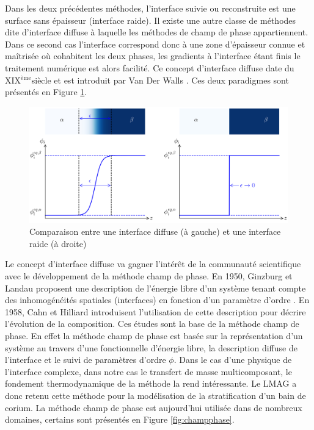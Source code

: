 Dans les deux précédentes méthodes, l'interface suivie ou reconstruite est une surface sans épaisseur (interface raide). Il existe une autre classe de méthodes dite d'interface diffuse à laquelle les méthodes de champ de phase appartiennent.
Dans ce second cas l'interface correspond donc à une zone d'épaisseur connue et maîtrisée où cohabitent les deux phases, les gradients à l'interface étant finis le traitement numérique est alors facilité. Ce concept d'interface diffuse date du XIX$^{\text{ème}}$siècle et est introduit par Van Der Walls \cite{rowlinson_translation_1979}. Ces deux paradigmes sont présentés en Figure \ref{fig:diffuseinterface}.
\begin{figure}[H]
	\centering
	\includegraphics[width=0.7\linewidth]{figure/diffuse_interface}
	\caption{Comparaison entre une interface diffuse (à gauche) et une interface raide (à droite)}
	\label{fig:diffuseinterface}
\end{figure} 
Le concept d'interface diffuse va gagner l'intérêt de la communauté scientifique avec le développement de la méthode champ de phase. En 1950, Ginzburg et Landau proposent une description de l'énergie libre d'un système tenant compte des inhomogénéités spatiales (interfaces) en fonction d'un paramètre d'ordre \cite{landau_physique_1995}. En 1958, Cahn et Hilliard \cite{cahn_free_1958}  introduisent l'utilisation de cette description pour décrire l'évolution de la composition. Ces études sont la base de la méthode champ de phase. En effet la méthode champ de phase est basée sur la représentation d'un système au travers d'une fonctionnelle d'énergie libre, la description diffuse de l'interface et le suivi de paramètres d'ordre $\phi$. Dans le cas d'une physique de l'interface complexe, dans notre cas le transfert de masse multicomposant, le fondement thermodynamique de la méthode la rend intéressante. Le LMAG a donc retenu cette méthode pour la modélisation de la stratification d'un bain de corium. La méthode champ de phase est aujourd'hui utilisée dans de nombreux domaines, certains sont présentés en Figure \ref{fig:champphase}.
